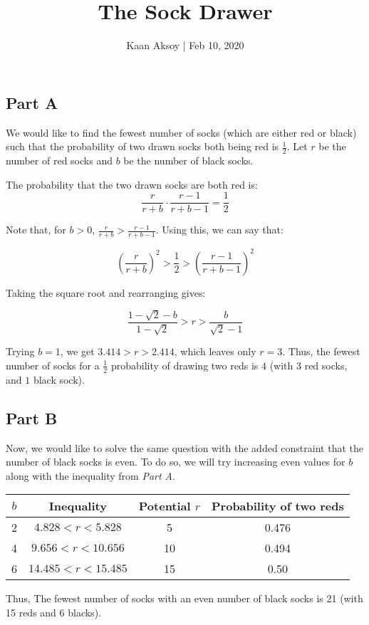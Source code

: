 \documentclass{article}
\date{}
\author{Kaan Aksoy | Feb 10, 2020}
\title{The Sock Drawer}
\begin{document}
\maketitle
\subsection{Part A}

We would like to find the fewest number of socks (which are either red or black) such that
the probability of two drawn socks both being red is $\frac{1}{2}$. 
Let $r$ be the number of red socks and $b$ be the number of 
black socks. 

The probability that the two drawn socks are both red is:
$$\frac{r}{r+b}\cdot\frac{r-1}{r+b-1} = \frac{1}{2}$$

Note that, for $b > 0$, $\frac{r}{r+b} > \frac{r-1}{r+b-1}$.
Using this, we can say that:

$$\left( \frac{r}{r+b} \right)^2 > \frac{1}{2} 
> \left( \frac{r-1}{r+b-1} \right)^2$$

Taking the square root and rearranging gives:
    
$$\frac{1-\sqrt{2}-b}{1-\sqrt{2}} > r > \frac{b}{\sqrt{2}-1}$$

Trying $b=1$, we get $3.414 > r > 2.414$, which leaves only 
$r=3$. Thus, the fewest number of socks for a $\frac{1}{2}$ 
probability of drawing two reds is $4$ 
(with $3$ red socks, and $1$ black sock).


\subsection{Part B}
Now, we would like to solve the same question with the added 
constraint that the number of black socks is even. To do so,
we will try increasing even values for $b$ along with the 
inequality from \textit{Part A}.

\begin{center}
\begin{tabular}{ |c|c|c|c| }
 \hline
 $b$ & Inequality & Potential $r$ & Probability of two reds \\ 
 \hline
 2 & $ 4.828 < r < 5.828 $ & 5 & 0.476 \\  
 4 & $ 9.656 < r < 10.656 $ & 10 & 0.494 \\
 6 & $ 14.485 < r < 15.485 $ & 15 & 0.50 \\
 \hline
\end{tabular}
\end{center}

Thus, The fewest number of socks with an even number of black 
socks is 21 (with 15 reds and 6 blacks).
\end{document}
